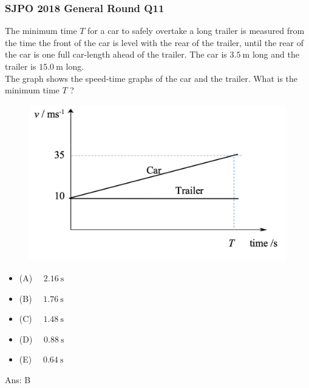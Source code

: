 \documentclass{article}
\begin{document}
\subsubsection{SJPO 2018 General Round Q11}
The minimum time $T$ for a car to safely overtake a long trailer is measured from the time the front of the car is level with the rear of the trailer, until the rear of the car is one full car-length ahead of the trailer. The car is $3.5 \mathrm{~m}$ long and the trailer is $15.0 \mathrm{~m}$ long.\\[10pt]
The graph shows the speed-time graphs of the car and the trailer. What is the minimum time $T$ ?\\
{
\begin{figure}
\includegraphics[width=1.0\linewidth]{images/sjpo2018q11.png}
\end{figure}
\begin{itemize}
\item[] (A) $\quad 2.16 \mathrm{~s}$
\item[] (B) $\quad 1.76 \mathrm{~s}$
\item[] (C) $\quad 1.48 \mathrm{~s}$
\item[] (D) $\quad 0.88 \mathrm{~s}$
\item[] (E) $\quad 0.64 \mathrm{~s}$
\end{itemize}
Ans: \ifpaper B \fi
}
\end{document}
